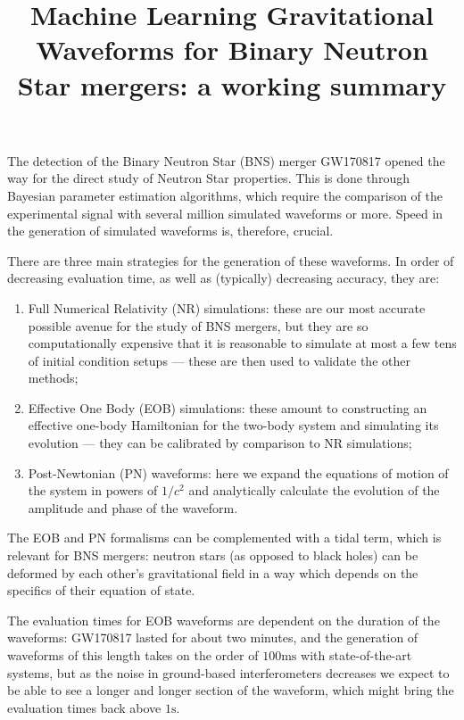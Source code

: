 \documentclass[11pt]{article}
\title{Machine Learning Gravitational Waveforms for Binary Neutron Star mergers: a working summary}
\begin{document}
\maketitle

The detection of the Binary Neutron Star (BNS) merger GW170817 opened the way for the direct study of Neutron Star properties.
This is done through Bayesian parameter estimation algorithms, which require the comparison of the experimental signal with several million \cite{lackeyEffectiveonebodyWaveformsBinary2017} simulated waveforms or more.
Speed in the generation of simulated waveforms is, therefore, crucial. 

There are three main strategies for the generation of these waveforms. In order of decreasing evaluation time, as well as (typically) decreasing accuracy, they are:
\begin{enumerate}
    \item Full Numerical Relativity (NR) simulations: these are our most accurate possible avenue for the study of BNS mergers, but they are so computationally expensive that it is reasonable to simulate at most a few tens of initial condition setups --- these are then used to validate the other methods;
    \item Effective One Body (EOB) simulations: these amount to constructing an effective one-body Hamiltonian for the two-body system and simulating its evolution --- they can be calibrated by comparison to NR simulations;
    \item Post-Newtonian (PN) waveforms: here we expand the equations of motion of the system in powers of $1/c^2$ and analytically calculate the evolution of the amplitude and phase of the waveform.
\end{enumerate}

The EOB and PN formalisms can be complemented with a tidal term, which is relevant for BNS mergers: neutron stars (as opposed to black holes) can be deformed by each other's gravitational field in a way which depends on the specifics of their equation of state. 

The evaluation times for EOB waveforms are dependent on the duration of the waveforms: GW170817 lasted for about two minutes, and the generation of waveforms of this length takes on the order of $100\text{ms}$ with state-of-the-art systems, but as the noise in ground-based interferometers decreases we expect to be able to see a longer and longer section of the waveform, which might bring the evaluation times back above $1\text{s}$. 
\end{document}
